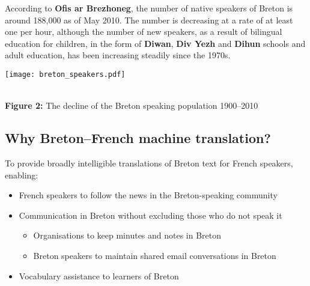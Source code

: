 \documentclass[a0,landscape]{a0poster}
\begin{document}
\begin{multicols}{4}
\noindent
According to \textbf{Ofis ar Brezhoneg}, the number of native speakers
of Breton is around 188,000 as of May 2010. The number is decreasing at a rate of at 
least one per hour, although the number of new speakers, as a result of bilingual education
for children, in the form of \textbf{Diwan}, \textbf{Div Yezh} and \textbf{Dihun} schools 
and adult education, has been increasing steadily since the 1970s.

\vspace{0.7cm}

\begin{center}
\begin{minipage}[b]{20cm}
\texttt{[image: breton\_speakers.pdf]}
\end{minipage}\\
\textbf{Figure 2:} The decline of the Breton speaking population 1900--2010
\end{center}

\subsection{Why Breton--French machine translation?}
To provide broadly intelligible translations of Breton text for French speakers, enabling:

\begin{itemize}
 \item French speakers to follow the news in the Breton-speaking community
 \item Communication in Breton without excluding those who do not speak it
 \begin{itemize}
  \item Organisations to keep minutes and notes in Breton 
  \item Breton speakers to maintain shared email conversations in Breton 
 \end{itemize}
  \item Vocabulary assistance to learners of Breton 
\end{itemize}



\end{multicols}
\end{document}
